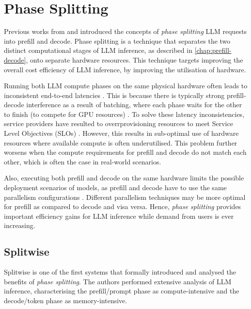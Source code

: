 \section{Phase Splitting}

Previous works from \textcite{zhongDistServeDisaggregatingPrefill2024} and \textcite{patelSplitwiseEfficientGenerative2024} introduced the concepts of \textit{phase splitting} LLM requests into prefill and decode.
Phase splitting is a technique that separates the two distinct computational stages of LLM inference, as described in \autoref{chap:prefill-decode}, onto separate hardware resources.
This technique targets improving the overall cost efficiency of LLM inference, by improving the utilisation of hardware.

Running both LLM compute phases on the same physical hardware often leads to inconsistent end-to-end latencies  \autocite{patelSplitwiseEfficientGenerative2024}.
This is because there is typically strong prefill-decode interference as a result of batching, where each phase waits for the other to finish (to compete for GPU resources) \autocite{zhongDistServeDisaggregatingPrefill2024}.
To solve these latency inconsistencies, service providers have resulted to overrprovisioning resources to meet Service Level Objectives (SLOs) \autocite{zhongDistServeDisaggregatingPrefill2024}.
However, this results in sub-optimal use of hardware resources where available compute is often underutilised.
This problem further worsens when the compute requirements for prefill and decode do not match each other, which is often the case in real-world scenarios. %

Also, executing both prefill and decode on the same hardware limits the possible deployment scenarios of models, as prefill and decode have to use the same parallelism configurations \autocite{zhongDistServeDisaggregatingPrefill2024}.
Different parallelism techniques may be more optimal for prefill as compared to decode and visa versa.
Hence, \textit{phase splitting} provides important efficiency gains for LLM inference while demand from users is ever increasing.


\subsection{Splitwise}
Splitwise \autocite{patelSplitwiseEfficientGenerative2024} is one of the first systems that formally introduced and analysed the benefits of \textit{phase splitting}.
The authors performed extensive analysis of LLM inference, characterising the prefill/prompt phase as compute-intensive and the decode/token phase as memory-intensive.


